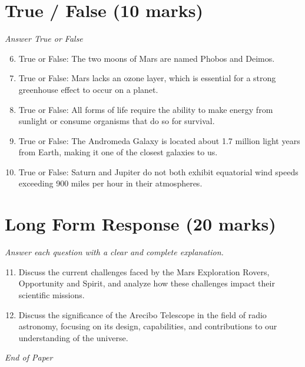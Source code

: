\documentclass[12pt]{article}
\begin{document}
\section*{True / False (10 marks)}
\textit{Answer True or False}
\begin{enumerate}[label=\arabic*.]
\setcounter{enumi}{5}
\item True or False: The two moons of Mars are named Phobos and Deimos.
\item True or False: Mars lacks an ozone layer, which is essential for a strong greenhouse effect to occur on a planet.
\item True or False: All forms of life require the ability to make energy from sunlight or consume organisms that do so for survival.
\item True or False: The Andromeda Galaxy is located about 1.7 million light years from Earth, making it one of the closest galaxies to us.
\item True or False: Saturn and Jupiter do not both exhibit equatorial wind speeds exceeding 900 miles per hour in their atmospheres.
\end{enumerate}

\section*{Long Form Response (20 marks)}
\textit{Answer each question with a clear and complete explanation.}
\begin{enumerate}[label=\arabic*.]
\setcounter{enumi}{10}
\item Discuss the current challenges faced by the Mars Exploration Rovers, Opportunity and Spirit, and analyze how these challenges impact their scientific missions.
\item Discuss the significance of the Arecibo Telescope in the field of radio astronomy, focusing on its design, capabilities, and contributions to our understanding of the universe.
\end{enumerate}

\vfill
\noindent\textit{End of Paper}
\end{document}
